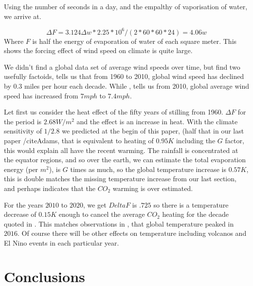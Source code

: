 \documentclass{book}
\begin{document}
      
   Using the number of seconds in a day, and the empalthy of vaporisation of water, we arrive at.
   
   \begin{equation}
   	\Delta F = 3.124 \Delta w * 2.25*10^{6} / (2*60*60*24)  = 4.06 w
   \end{equation}
   Where $F$ is half the energy of evaporation of water of each square meter. This shows the forcing effect of wind speed on climate is quite large.
   
   We didn't find a global data set of average wind speeds over time, but find two usefully factoids, \cite{Horizion} tells us that from 1960 to 2010, global wind speed has declined by $0.3$ miles per hour each decade.
   While \cite{SciAmWind}, tells us from 2010, global average wind speed has increased from $7 mph$ to $7.4 mph$.
   
   Let first us consider the heat effect of the fifty years of stilling from 1960. $\Delta F $ for the period is $2.68 W/m^2$ and the effect is an increase in heat. With the climate sensitivity of $1/2.8$ we predicted at the begin of this paper, (half that in our last paper /cite{Adams}, that is equivalent to heating of $0.95K$ including the $G$ factor, this would explain all have the recent warming. The rainfall is concentrated at the equator regions, and so over the earth, we can estimate the total evaporation energy (per $m^2$), is $G$ times as much, so the global temperature increase is $0.57 K$, this is double matches the missing temperature increase from our last section, and perhaps indicates that the $CO_2$ warming is over estimated.
     
   For the years $2010$ to $2020$, we get $Delta F $ is $.725$ so there is a temperature decrease of $0.15K$ enough to cancel the average $CO_2$ heating for the decade quoted in \cite{GlobTemp}. This matches observations in  \cite{GlobTemp}, that global temperature peaked in $2016$. Of course there will be other effects on temperature including volcanos and El Nino events in each particular year.
   
           	
   \section{Conclusions}
   
\end{document}
